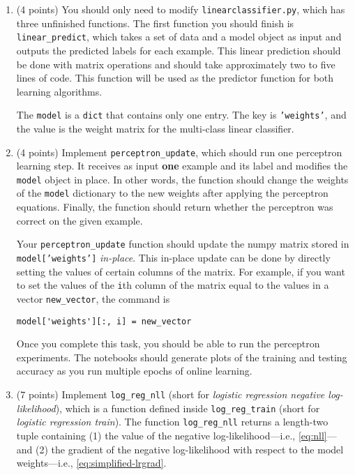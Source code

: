 \documentclass[10pt]{article}
\begin{document}
\begin{enumerate}

\item (4 points) You should only need to modify \texttt{linearclassifier.py}, which has three unfinished functions. The first function you should finish is \texttt{linear\_predict}, which takes a set of data and a model object as input and outputs the predicted labels for each example. This linear prediction should be done with matrix operations and should take approximately two to five lines of code. This function will be used as the predictor function for both learning algorithms. 

The \texttt{model} is a \texttt{dict} that contains only one entry. The key is \texttt{'weights'}, and the value is the weight matrix for the multi-class linear classifier. 

\item (4 points) Implement \texttt{perceptron\_update}, which should run one perceptron learning step. It receives as input \textbf{one} example and its label and modifies the \texttt{model} object in place. In other words, the function should change the weights of the \texttt{model} dictionary to the new weights after applying the perceptron equations. Finally, the function should return whether the perceptron was correct on the given example.

Your \texttt{perceptron\_update} function should update the numpy matrix stored in \texttt{model['weights']} \textit{in-place}. This in-place update can be done by directly setting the values of certain columns of the matrix. For example, if you want to set the values of the \texttt{i}th column of the matrix equal to the values in a vector \texttt{new\_vector}, the command is
\begin{verbatim}
model['weights'][:, i] = new_vector
\end{verbatim}

Once you complete this task, you should be able to run the perceptron experiments. The notebooks should generate plots of the training and testing accuracy as you run multiple epochs of online learning.

\item (7 points) Implement \texttt{log\_reg\_nll} (short for \textit{logistic regression negative log-likelihood}), which is a function defined inside \texttt{log\_reg\_train} (short for \textit{logistic regression train}). The function \texttt{log\_reg\_nll} returns a length-two tuple containing (1) the value of the negative log-likelihood---i.e., \cref{eq:nll}---and (2) the gradient of the negative log-likelihood with respect to the model weights---i.e., \cref{eq:simplified-lrgrad}. 


\end{enumerate}
\end{document}
